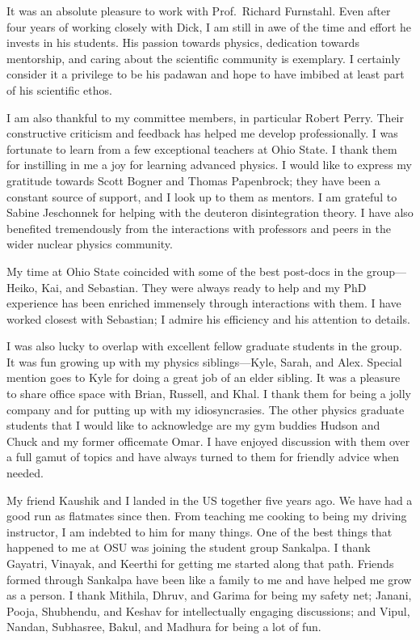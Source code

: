 \begin{acknowledgments}

  It was an absolute pleasure to work with Prof.\ Richard Furnstahl.  Even after
  four years of working closely with Dick, I am still in awe of the time and
  effort he invests in his students.  His passion towards physics, dedication
  towards mentorship, and caring about the scientific community is exemplary.
  I certainly consider it a privilege to be his padawan and hope to have
  imbibed at least part of his scientific ethos.

  I am also thankful to my committee members, in particular Robert
  Perry.  Their constructive criticism and feedback has helped me develop
  professionally.  I was fortunate to learn from a few exceptional
  teachers at Ohio State.  I thank them for instilling in me a joy for learning
  advanced physics.  I would like to express my gratitude towards
  Scott Bogner and Thomas Papenbrock; they have been a constant source of
  support, and I look up to them as mentors.  I am grateful to
  Sabine Jeschonnek for helping with the deuteron disintegration theory.
  I have also benefited tremendously from the interactions with professors
  and peers in the wider nuclear physics community.

  My time at Ohio State coincided with some of the best
  post-docs in the group---Heiko, Kai, and Sebastian.  They were always ready
  to help and my PhD experience has
  been enriched immensely through interactions with them.  I have worked
  closest with Sebastian; I admire his efficiency and his attention to details.

  I was also lucky to overlap with excellent fellow graduate students in the group.
  It was fun growing up with my physics siblings---Kyle, Sarah, and Alex.
  Special mention goes to Kyle for doing a great job of an elder sibling.
  It was a pleasure to share office space with Brian, Russell, and Khal.
  I thank them for being a jolly company and for putting up with my
  idiosyncrasies.  The other physics graduate students that I would like
  to acknowledge are my gym buddies Hudson and Chuck and my former officemate
  Omar.  I have enjoyed discussion with them over a full gamut of topics and
  have always turned to them for friendly advice when needed.

  My friend Kaushik and I landed in the US together five years ago.  We have had
  a good run as flatmates since then.  From teaching me cooking to being my
  driving
  instructor, I am indebted to him for many things.  One of the best things
  that happened to me at OSU was joining the student group Sankalpa.  I thank
  Gayatri, Vinayak, and Keerthi for getting me started along that path.
  Friends formed through Sankalpa have been like a family to me and have
  helped me grow as a person.  I thank Mithila, Dhruv, and Garima for being
  my safety net; Janani, Pooja, Shubhendu, and Keshav for intellectually
  engaging discussions; and Vipul, Nandan, Subhasree, Bakul, and Madhura for
  being a lot of fun.


\end{acknowledgments}
